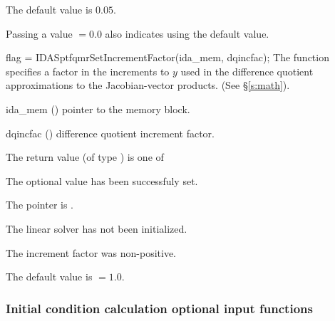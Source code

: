 {
  The default value is $0.05$.

  Passing a value $ = 0.0$ also indicates using the default value.
}
{
  flag = IDASptfqmrSetIncrementFactor(ida\_mem, dqincfac);
}
{
  The function  specifies a factor in the 
  increments to $y$ used in the difference quotient approximations 
  to the Jacobian-vector products.  (See \S\ref{s:math}).
}
{
  \begin{args}[dqincfac]
  \item[ida\_mem] ()
    pointer to the {\ida} memory block.
  \item[dqincfac] ()
    difference quotient increment factor.
  \end{args}
}
{
  The return value  (of type ) is one of
  \begin{args}
  \item[\Id{IDASPTFQMR\_SUCCESS}] 
    The optional value has been successfuly set.
  \item[\Id{IDASPTFQMR\_MEM\_NULL}]
    The  pointer is .
  \item[\Id{IDASPTFQMR\_LMEM\_NULL}]
    The {\idaspgmr} linear solver has not been initialized.
  \item[\Id{IDASPTFQMR\_ILL\_INPUT}]
    The increment factor was non-positive.
  \end{args}
}
{
  The default value is  $=1.0$.
}
\subsubsection{Initial condition calculation optional input functions}

